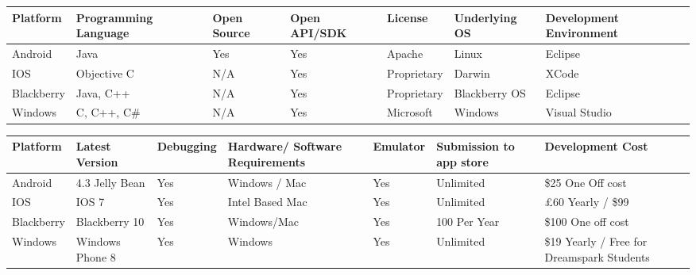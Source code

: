 \newpage
\begin{landscape}
\begin{table}
    \begin{tabular}{|l|l|l|l|l|l|l|}
    \hline
                      Platform & Programming Language & Open Source & Open API/SDK & License     & Underlying OS & Development Environment \\ \hline
    Android                    & Java                 & Yes         & Yes          & Apache      & Linux         & Eclipse                 \\ \hline
    IOS                        & Objective C          & N/A         & Yes          & Proprietary & Darwin        & XCode                   \\ \hline
    Blackberry                 & Java, C++            & N/A         & Yes          & Proprietary & Blackberry OS & Eclipse                 \\ \hline
    Windows                    & C, C++, C\#           & N/A         & Yes          & Microsoft   & Windows       & Visual Studio           \\ \hline
    \end{tabular}
\end{table}




\begin{table}
    \begin{tabular}{|l|l|l|l|l|l|l|}
    \hline
    Platform   & Latest Version    & Debugging & Hardware/ Software Requirements & Emulator & Submission to app store & Development Cost                            \\ \hline
    Android    & 4.3 Jelly   Bean  & Yes       & Windows   / Mac                 & Yes      & Unlimited               & \$25 One   Off cost                          \\ \hline
    IOS        & IOS 7             & Yes       & Intel   Based Mac               & Yes      & Unlimited               & £60   Yearly / \$99                          \\ \hline
    Blackberry & Blackberry   10   & Yes       & Windows/Mac                     & Yes      & 100 Per   Year          & \$100   One off cost                         \\ \hline
    Windows    & Windows   Phone 8 & Yes       & Windows                         & Yes      & Unlimited               & \$19   Yearly / Free for Dreamspark Students \\ \hline
    \end{tabular}
\end{table}

\end{landscape}

